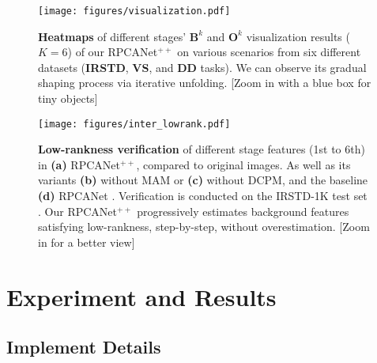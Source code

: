 \documentclass[10pt,journal,compsoc]{IEEEtran}
\begin{document}
\begin{figure*}[!ht]
\centering
\setlength{\abovecaptionskip}{1pt}
\setlength{\belowcaptionskip}{0pt}
   \texttt{[image: figures/visualization.pdf]}
   \caption{\textbf{Heatmaps} of different stages' $\textbf{B}^{k}$ and $\textbf{O}^{k}$ visualization results ($K=6$) of our RPCANet$^{++}$ on various scenarios from six different datasets (\textbf{IRSTD}, \textbf{VS}, and \textbf{DD} tasks). We can observe its gradual shaping process via iterative unfolding. [Zoom in with a \textcolor{cyan!30}{blue} box for tiny objects]}
   \label{fig:mv}
   \vspace{-0.3cm}
\end{figure*}

\begin{figure*}[!ht]
\centering
\setlength{\abovecaptionskip}{1pt}
\setlength{\belowcaptionskip}{0pt}
   \texttt{[image: figures/inter\_lowrank.pdf]}
   \caption{\textbf{Low-rankness verification} of different stage features (1st to 6th) in \textbf{(a)} RPCANet$^{++}$, compared to original images.  As well as its variants \textbf{(b)} without  MAM or \textbf{(c)} without DCPM, and the baseline \textbf{(d)} RPCANet \cite{wu-2024-rpcanet}. Verification is conducted on the IRSTD-1K test set \cite{zhang-2022-isnet}. Our RPCANet$^{++}$ progressively estimates background features satisfying low-rankness, step-by-step, without overestimation. [Zoom in for a better view]}
   \label{fig:interl}   
      \vspace{-0.4cm}
\end{figure*}

\section{Experiment and Results}
\label{sec:4}
\subsection{Implement Details}
\label{sec:4.1}
\end{document}
